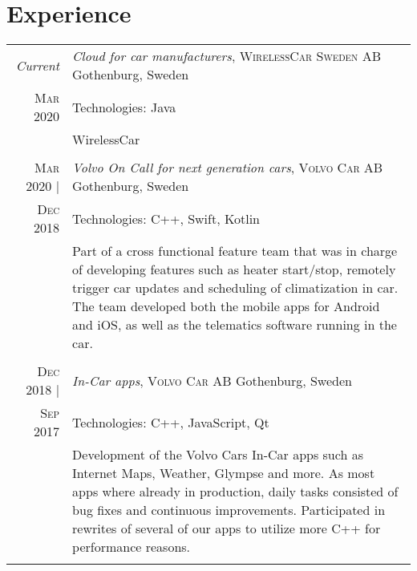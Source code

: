 \documentclass[a4paper,10pt]{scrartcl} %
\begin{document}

\section{Experience}
\begin{tabular}{r|p{15cm}}


\emph{Current} 	                    & \emph{Cloud for car manufacturers}, \textsc{WirelessCar Sweden AB} \hfill Gothenburg, Sweden \\
\textsc{Mar 2020}                   & \footnotesize{Technologies: Java} \\
\phantom{abcdefghijklm}             & \footnotesize{
WirelessCar } \\
\multicolumn{2}{c}{} \\


\textsc{Mar 2020} |	                & \emph{Volvo On Call for next generation cars}, \textsc{Volvo Car AB} \hfill Gothenburg, Sweden \\
\textsc{Dec 2018}                   & \footnotesize{Technologies: C++, Swift, Kotlin} \\
\phantom{abcdefghijklm}             & \footnotesize{
Part of a cross functional feature team that was in charge of developing features such as heater start/stop, remotely trigger car updates and scheduling of climatization in car. The team developed both the mobile apps for Android and iOS, as well as the telematics software running in the car. } \\
\multicolumn{2}{c}{} \\


\textsc{Dec 2018} | 	            & \emph{In-Car apps}, \textsc{Volvo Car AB} \hfill Gothenburg, Sweden \\
\textsc{Sep 2017}                   & \footnotesize{Technologies: C++, JavaScript, Qt} \\
\phantom{abcdefghijklm}             & \footnotesize{
Development of the Volvo Cars In-Car apps such as Internet Maps, Weather, Glympse and more. As most apps where already in production, daily tasks consisted of bug fixes and continuous improvements. Participated in rewrites of several of our apps to utilize more C++ for performance reasons. } \\
\multicolumn{2}{c}{} \\


\end{tabular}
\end{document}
